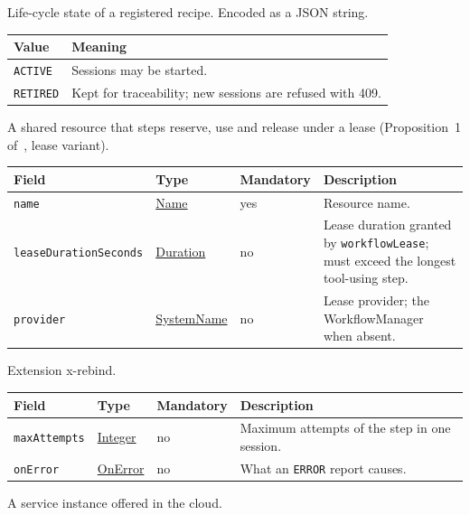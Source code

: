 \documentclass[a4paper]{arrowhead}
\newcommand{\mref}[1]{{\textcolor{ArrowheadPurple}{\hyperref[sec:model:#1]{#1}}}}
\newcommand{\pref}[1]{{\textcolor{ArrowheadGrey}{\hyperref[sec:model:primitives:#1]{#1}}}}
\begin{document}
Life-cycle state of a registered recipe.
 Encoded as a JSON string.
{\small
\begin{longtable}{|p{3.9cm}|p{11.9cm}|}

\hline
\rowcolor{gray!33} Value & Meaning \\ \hline
\endhead
\texttt{ACTIVE} & Sessions may be started. \\ \hline
\texttt{RETIRED} & Kept for traceability; new sessions are refused with 409. \\ \hline
\end{longtable}
}

A shared resource that steps reserve, use and release under a lease (Proposition~1 of~\cite{varga2026}, lease variant).

{\small
\begin{longtable}{|p{3.7cm}|p{4.2cm}|p{1.6cm}|p{6.3cm}|}

\hline
\rowcolor{gray!33} Field & Type & Mandatory & Description \\ \hline
\endhead
\texttt{name} & \pref{Name} & yes & Resource name. \\ \hline
\texttt{leaseDurationSeconds} & \pref{Duration} & no & Lease duration granted by \texttt{workflowLease}; must exceed the longest tool-using step. \\ \hline
\texttt{provider} & \pref{SystemName} & no & Lease provider; the WorkflowManager when absent. \\ \hline
\end{longtable}
}

Extension x-rebind.

{\small
\begin{longtable}{|p{3.7cm}|p{4.2cm}|p{1.6cm}|p{6.3cm}|}

\hline
\rowcolor{gray!33} Field & Type & Mandatory & Description \\ \hline
\endhead
\texttt{maxAttempts} & \pref{Integer} & no & Maximum attempts of the step in one session. \\ \hline
\texttt{onError} & \mref{OnError} & no & What an \texttt{ERROR} report causes. \\ \hline
\end{longtable}
}

A service instance offered in the cloud.
\end{document}
